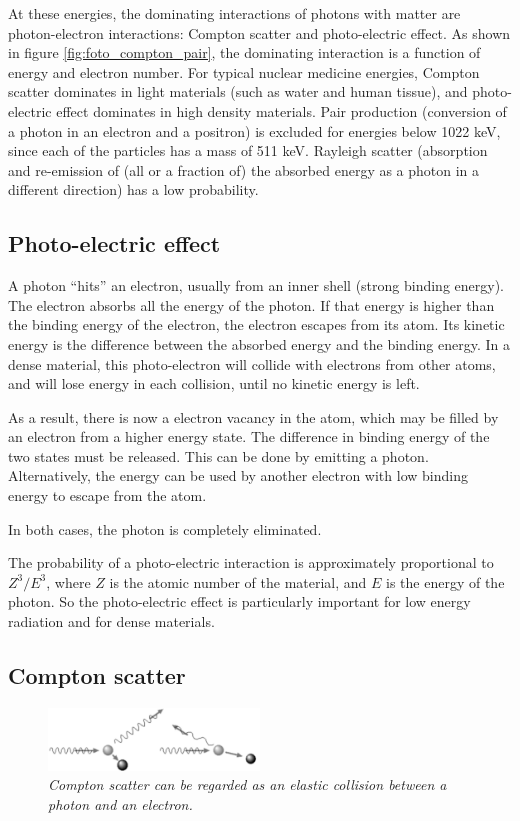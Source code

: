 \documentclass[11pt,oneside]{article}
\begin{document}
At these energies, the dominating interactions of photons with matter are
photon-electron interactions: Compton scatter and photo-electric effect. As
shown in figure \ref{fig:foto_compton_pair}, the dominating interaction is a
function of energy and electron number. For typical nuclear medicine
energies, Compton scatter dominates in light materials (such as water and
human tissue), and photo-electric effect dominates in high density materials.
Pair production (conversion of a photon in an electron and a positron) is
excluded for energies below 1022 keV, since each of the particles has a mass
of 511 keV. Rayleigh scatter (absorption and re-emission of (all or a
fraction of) the absorbed energy as a photon in a different direction) has a
low probability.

\subsection{Photo-electric effect}
A photon ``hits'' an electron, usually from an inner shell (strong
binding energy). The electron absorbs all the energy of the photon. If
that energy is higher than the binding energy of the electron, the
electron escapes from its atom. Its kinetic energy is the difference
between the absorbed energy and the binding energy. In a dense
material, this photo-electron will collide with electrons from other
atoms, and will lose energy in each collision, until no kinetic energy
is left.

As a result, there is now a electron vacancy in the atom, which may be filled
by an electron from a higher energy state. The difference in binding energy
of the two states must be released. This can be done by emitting a photon.
Alternatively, the energy can be used by another electron with low binding
energy to escape from the atom.

In both cases, the photon is completely eliminated.

The probability of a photo-electric interaction is approximately proportional
to $Z^3 / E^3$, where $Z$ is the atomic number of the material, and $E$ is the
energy of the photon. So the photo-electric effect is particularly important for
low energy radiation and for dense materials.

\subsection{Compton scatter} \label{sec:compton_scatter}
\begin{figure}[tb]
\centering
\includegraphics[width=0.5\textwidth]{figs/fig_compton_scatter.pdf}
\caption{\label{fig:compton_scatter} \emph{Compton scatter can be regarded as
an elastic collision between a photon and an electron.}}
\end{figure}
\end{document}
